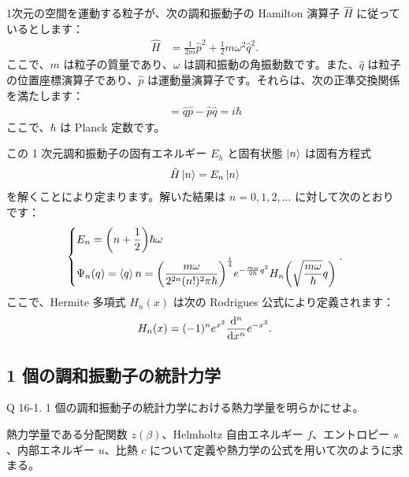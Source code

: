 \documentclass[uplatex,dvipdfmx,a4paper,11pt]{jlreq}
\theoremstyle{definition}
\begin{document}
1次元の空間を運動する粒子が、次の調和振動子の Hamilton 演算子 $\hat{H}$ に従っているとします：
\begin{align}
  \hat{H} & = \frac{1}{2m}\hat{p}^2 + \frac{1}{2}m\omega^2\hat{q}^2.
\end{align}
ここで、$m$ は粒子の質量であり、$\omega$ は調和振動の角振動数です。また、$\hat{q}$ は粒子の位置座標演算子であり、$\hat{p}$ は運動量演算子です。それらは、次の正準交換関係を満たします：
\begin{align}
  [\hat{q}, \hat{p}] = \hat{q}\hat{p} - \hat{p}\hat{q} = i\hbar
\end{align}
ここで、$\hbar$ は Planck 定数です。

この 1 次元調和振動子の固有エネルギー $E_h$ と固有状態 $\ket{n}$ は固有方程式
\begin{align}
  \hat{H}\ket{n} = E_n\ket{n}
\end{align}
を解くことにより定まります。解いた結果は $n = 0, 1, 2, \ldots$ に対して次のとおりです：
\begin{align}
  \begin{dcases}
    E_n        = \qty(n + \frac{1}{2})\hbar\omega \\
    \Psi_n(q) = \braket{q}{n} = \qty(\frac{m\omega}{2^{2n}(n!)^2\pi\hbar})^{\frac{1}{4}}e^{-\frac{m\omega}{2\hbar}q^2}H_n\qty(\sqrt{\frac{m\omega}{\hbar}}q)
  \end{dcases}.
\end{align}
ここで、Hermite 多項式 $H_n(x)$ は次の Rodrigues 公式により定義されます：
\begin{align}
  H_n(x) = (-1)^ne^{x^2}\dv[n]{x}e^{-x^2}.
\end{align}

\subsection{1 個の調和振動子の統計力学}
\begin{itembox}[l]{Q 16-1.}
  1 個の調和振動子の統計力学における熱力学量を明らかにせよ。
\end{itembox}

熱力学量である分配関数 $z(\beta)$、Helmholtz 自由エネルギー $f$、エントロピー $s$、内部エネルギー $u$、比熱 $c$ について定義や熱力学の公式を用いて次のように求まる。
\end{document}
